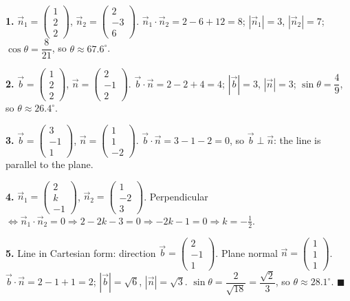 \documentclass[11pt]{article}
\begin{document}
\begin{corrige}[Exercise 1]
\textbf{1.} $\vec{n}_1=\begin{pmatrix}1\\2\\2\end{pmatrix}$, $\vec{n}_2=\begin{pmatrix}2\\-3\\6\end{pmatrix}$.
$\vec{n}_1\cdot\vec{n}_2=2-6+12=8$; $|\vec{n}_1|=3$, $|\vec{n}_2|=7$; $\cos\theta=\dfrac{8}{21}$, so $\theta\approx 67.6^\circ$.

\textbf{2.} $\vec{b}=\begin{pmatrix}1\\2\\2\end{pmatrix}$, $\vec{n}=\begin{pmatrix}2\\-1\\2\end{pmatrix}$.
$\vec{b}\cdot\vec{n}=2-2+4=4$; $|\vec{b}|=3$, $|\vec{n}|=3$; $\sin\theta=\dfrac{4}{9}$, so $\theta\approx 26.4^\circ$.

\textbf{3.} $\vec{b}=\begin{pmatrix}3\\-1\\1\end{pmatrix}$, $\vec{n}=\begin{pmatrix}1\\1\\-2\end{pmatrix}$.
$\vec{b}\cdot\vec{n}=3-1-2=0$, so $\vec{b}\perp\vec{n}$: the line is parallel to the plane.

\textbf{4.} $\vec{n}_1=\begin{pmatrix}2\\k\\-1\end{pmatrix}$, $\vec{n}_2=\begin{pmatrix}1\\-2\\3\end{pmatrix}$.
Perpendicular $\iff \vec{n}_1\cdot\vec{n}_2=0 \Rightarrow 2-2k-3=0 \Rightarrow -2k-1=0 \Rightarrow k=-\frac12$.

\textbf{5.} Line in Cartesian form: direction $\vec{b}=\begin{pmatrix}2\\-1\\1\end{pmatrix}$. Plane normal $\vec{n}=\begin{pmatrix}1\\1\\1\end{pmatrix}$.
$\vec{b}\cdot\vec{n}=2-1+1=2$; $|\vec{b}|=\sqrt{6}$, $|\vec{n}|=\sqrt{3}$.
$\sin\theta=\dfrac{2}{\sqrt{18}}=\dfrac{\sqrt{2}}{3}$, so $\theta\approx 28.1^\circ$. $\blacksquare$
\end{corrige}
\end{document}
